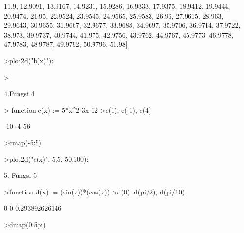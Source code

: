 \documentclass[a4paper,10pt]{article}
\begin{document}
\begin{eulernotebook}
\begin{eulercomment}
\begin{eulercomment}
\begin{euleroutput}
  11.9,  12.9091,  13.9167,  14.9231,  15.9286,  16.9333,  17.9375,
  18.9412,  19.9444,  20.9474,  21.95,  22.9524,  23.9545,  24.9565,
  25.9583,  26.96,  27.9615,  28.963,  29.9643,  30.9655,  31.9667,
  32.9677,  33.9688,  34.9697,  35.9706,  36.9714,  37.9722,  38.973,
  39.9737,  40.9744,  41.975,  42.9756,  43.9762,  44.9767,  45.9773,
  46.9778,  47.9783,  48.9787,  49.9792,  50.9796,  51.98]
\end{euleroutput}
\begin{eulerprompt}
>plot2d("b(x)"):
\end{eulerprompt}
\begin{eulerprompt}
>      
\end{eulerprompt}
\begin{eulercomment}
4.Fungsi 4
\end{eulercomment}
\begin{eulerprompt}
> function c(x) := 5*x^2-3x-12
>c(1), c(-1), c(4)
\end{eulerprompt}
\begin{euleroutput}
  -10
  -4
  56
\end{euleroutput}
\begin{eulerprompt}
>cmap(-5:5)
\end{eulerprompt}
\begin{euleroutput}
  [128,  80,  42,  14,  -4,  -12,  -10,  2,  24,  56,  98]
\end{euleroutput}
\begin{eulerprompt}
>plot2d("c(x)",-5,5,-50,100):
\end{eulerprompt}
\begin{eulercomment}
5. Fungsi 5
\end{eulercomment}
\begin{eulerprompt}
>function d(x) := (sin(x))*(cos(x))
>d(0), d(pi/2), d(pi/10)
\end{eulerprompt}
\begin{euleroutput}
  0
  0
  0.293892626146
\end{euleroutput}
\begin{eulerprompt}
>dmap(0:5pi)
\end{eulerprompt}
\begin{euleroutput}
  [0,  0.454649,  -0.378401,  -0.139708,  0.494679,  -0.272011,
  -0.268286,  0.495304,  -0.143952,  -0.375494,  0.456473,  -0.00442565,
  -0.452789,  0.381279,  0.135453,  -0.494016]
\end{euleroutput}

\end{eulercomment}
\end{eulercomment}
\end{eulernotebook}
\end{document}
